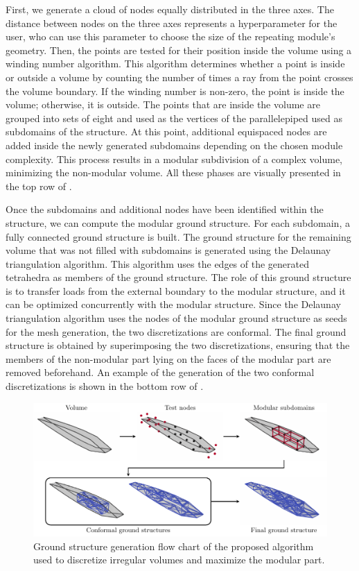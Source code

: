 First, we generate a cloud of nodes equally distributed in the three axes. The distance between nodes on the three axes represents a hyperparameter for the user, who can use this parameter to choose the size of the repeating module's geometry. Then, the points are tested for their position inside the volume using a winding number algorithm. This algorithm determines whether a point is inside or outside a volume by counting the number of times a ray from the point crosses the volume boundary. If the winding number is non-zero, the point is inside the volume; otherwise, it is outside. The points that are inside the volume are grouped into sets of eight and used as the vertices of the parallelepiped used as subdomains of the structure. At this point, additional equispaced nodes are added inside the newly generated subdomains depending on the chosen module complexity. This process results in a modular subdivision of a complex volume, minimizing the non-modular volume. All these phases are visually presented in the top row of .

Once the subdomains and additional nodes have been identified within the structure, we can compute the modular ground structure. For each subdomain, a fully connected ground structure is built. The ground structure for the remaining volume that was not filled with subdomains is generated using the Delaunay triangulation algorithm. This algorithm uses the edges of the generated tetrahedra as members of the ground structure. The role of this ground structure is to transfer loads from the external boundary to the modular structure, and it can be optimized concurrently with the modular structure. Since the Delaunay triangulation algorithm uses the nodes of the modular ground structure as seeds for the mesh generation, the two discretizations are conformal. The final ground structure is obtained by superimposing the two discretizations, ensuring that the members of the non-modular part lying on the faces of the modular part are removed beforehand. An example of the generation of the two conformal discretizations is shown in the bottom row of .

\begin{figure}
    \centering
    \includegraphics[width=\linewidth]{figures/07_aeronautic/00_naca_howtomesh/MESH.pdf}
     \caption{Ground structure generation flow chart of the proposed algorithm used to discretize irregular volumes and maximize the modular part.}
    \label{fig:07_howto}
\end{figure}

